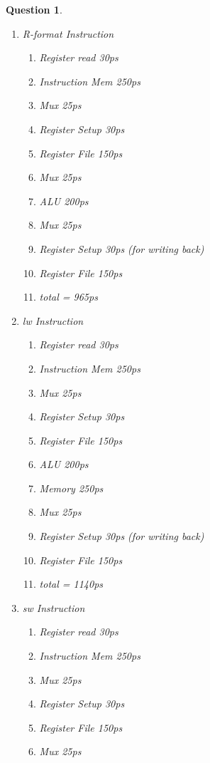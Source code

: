 \documentclass{article}
\theoremstyle{questionstyle}
\newtheorem{q}{Question}
\begin{document}
\begin{q}\begin{enumerate} \leavevmode
    \item R-format Instruction \begin{enumerate}
        \item Register read 30ps
        \item Instruction Mem 250ps
        \item Mux 25ps
        \item Register Setup 30ps
        \item Register File 150ps
        \item Mux 25ps
        \item ALU 200ps
        \item Mux 25ps
        \item Register Setup 30ps (for writing back)
        \item Register File 150ps
        \item total = 965ps
    \end{enumerate}
    \item lw Instruction \begin{enumerate}
        \item Register read 30ps
        \item Instruction Mem 250ps
        \item Mux 25ps
        \item Register Setup 30ps
        \item Register File 150ps
        \item ALU 200ps
        \item Memory 250ps 
        \item Mux 25ps
        \item Register Setup 30ps (for writing back)
        \item Register File 150ps
        \item total = 1140ps
    \end{enumerate}
    \item sw Instruction \begin{enumerate}
        \item Register read 30ps
        \item Instruction Mem 250ps
        \item Mux 25ps
        \item Register Setup 30ps
        \item Register File 150ps
        \item Mux 25ps

\end{enumerate}
\end{enumerate}
\end{q}
\end{document}

